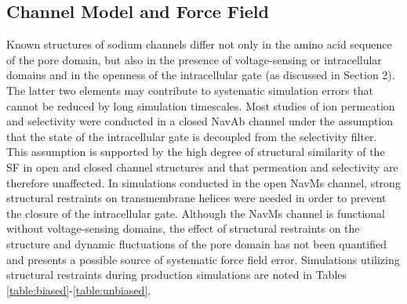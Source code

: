 \begin{refsection}
 \subsection{Channel Model and Force Field}
 Known structures of sodium channels differ not only in the amino acid sequence of the pore domain, but also in the presence of voltage-sensing or intracellular domains and in the openness of the intracellular gate (as discussed in Section 2).  The latter two elements may contribute to systematic simulation errors that cannot be reduced by long simulation timescales.  Most studies of ion permeation and selectivity were conducted in a closed NavAb channel under the assumption that the state of the intracellular gate is decoupled from the selectivity filter. This assumption is supported by the high degree of structural similarity of the SF in open and closed channel structures \cite{Payandeh:2012ib,Bagneris:2014eh} and that permeation and selectivity are therefore unaffected.  In simulations conducted in the open NavMs channel, strong structural restraints on transmembrane helices were needed in order to prevent the closure of the intracellular gate.  Although the NavMs channel is functional without voltage-sensing domains, the effect of structural restraints on the structure and dynamic fluctuations of the pore domain has not been quantified and presents a possible source of systematic force field error.  Simulations utilizing structural restraints during production simulations are noted in Tables \ref{table:biased}-\ref{table:unbiased}. 

\end{refsection}
